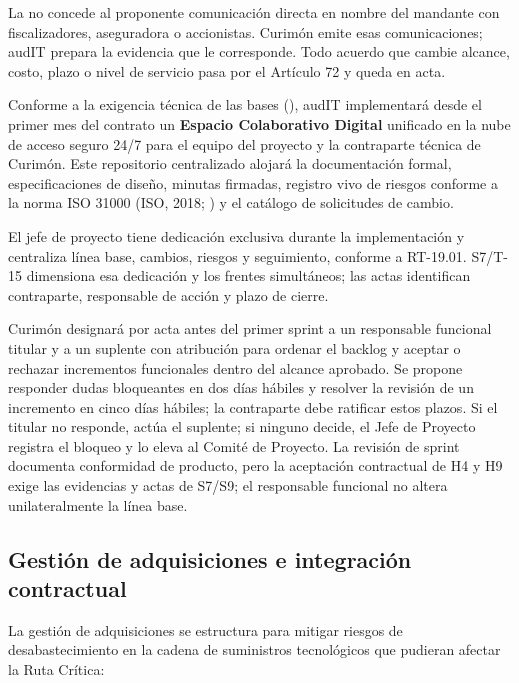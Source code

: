La  no concede al proponente comunicación directa en nombre del mandante con fiscalizadores, aseguradora o accionistas. Curimón emite esas comunicaciones; audIT prepara la evidencia que le corresponde. Todo acuerdo que cambie alcance, costo, plazo o nivel de servicio pasa por el Artículo 72 y queda en acta.

Conforme a la exigencia técnica de las bases (), audIT implementará desde el primer mes del contrato un \textbf{Espacio Colaborativo Digital} unificado en la nube de acceso seguro 24/7 para el equipo del proyecto y la contraparte técnica de Curimón. Este repositorio centralizado alojará la documentación formal, especificaciones de diseño, minutas firmadas, registro vivo de riesgos conforme a la norma ISO 31000 (ISO, 2018; ) y el catálogo de solicitudes de cambio.

El jefe de proyecto tiene dedicación exclusiva durante la implementación y centraliza línea base, cambios, riesgos y seguimiento, conforme a RT-19.01. S7/T-15 dimensiona esa dedicación y los frentes simultáneos; las actas identifican contraparte, responsable de acción y plazo de cierre.

Curimón designará por acta antes del primer sprint a un responsable funcional titular y a un suplente con atribución para ordenar el backlog y aceptar o rechazar incrementos funcionales dentro del alcance aprobado. Se propone responder dudas bloqueantes en dos días hábiles y resolver la revisión de un incremento en cinco días hábiles; la contraparte debe ratificar estos plazos. Si el titular no responde, actúa el suplente; si ninguno decide, el Jefe de Proyecto registra el bloqueo y lo eleva al Comité de Proyecto. La revisión de sprint documenta conformidad de producto, pero la aceptación contractual de H4 y H9 exige las evidencias y actas de S7/S9; el responsable funcional no altera unilateralmente la línea base.

\FloatBarrier
\subsection{Gestión de adquisiciones e integración contractual}\label{sec:6-gestion-adquisiciones}\label{sec:06-gestion-de-adquisiciones-e-integracion-contractual}

La gestión de adquisiciones se estructura para mitigar riesgos de desabastecimiento en la cadena de suministros tecnológicos que pudieran afectar la Ruta Crítica:

